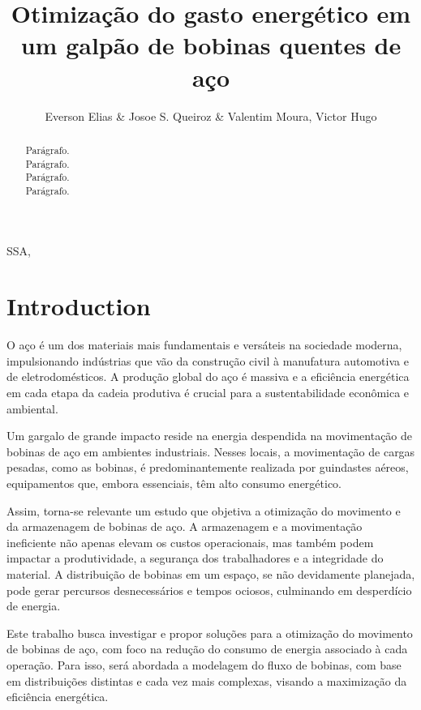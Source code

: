\documentclass[journal]{IEEEtran}
\begin{document}
    \title{Otimização do gasto energético em um galpão de bobinas quentes de aço}
    \nocite{*}
    \author{Everson Elias \& Josoe S. Queiroz \& Valentim Moura, Victor Hugo} 
    
    \maketitle
    	
    \begin{abstract}
        Parágrafo.\\
        Parágrafo.\\
        Parágrafo.\\
        Parágrafo.
    \end{abstract}
    
    \begin{IEEEkeywords}
        SSA, 
    \end{IEEEkeywords}
    
    \section{Introduction}

    O aço é um dos materiais mais fundamentais e versáteis na sociedade moderna, impulsionando indústrias
    que vão da construção civil à manufatura automotiva e de eletrodomésticos. A produção global do aço 
    é massiva e a eficiência energética em cada etapa da cadeia produtiva é crucial para a 
    sustentabilidade econômica e ambiental.

    Um gargalo de grande impacto reside na energia despendida na movimentação 
    de bobinas de aço em ambientes industriais. Nesses locais, a movimentação 
    de cargas pesadas, como as bobinas, é predominantemente realizada por 
    guindastes aéreos, equipamentos que, embora essenciais, têm alto consumo energético.

        Assim, torna-se relevante um estudo que objetiva a otimização do movimento e da
        armazenagem de bobinas de aço. A armazenagem e a movimentação ineficiente não 
        apenas elevam os custos operacionais, mas também podem impactar a produtividade,
        a segurança dos trabalhadores e a integridade do material. A distribuição de
        bobinas em um espaço, se não devidamente planejada, pode gerar percursos desnecessários
        e tempos ociosos, culminando em desperdício de energia.

        Este trabalho busca investigar e propor soluções para a otimização do movimento 
        de bobinas de aço, com foco na redução do consumo de energia associado à cada operação.
        Para isso, será abordada a modelagem do fluxo de bobinas, com base em
        distribuições distintas e cada vez mais complexas, visando a maximização da eficiência energética.
\end{document}
